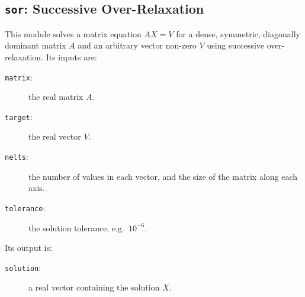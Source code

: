 \subsection{{\tt{sor}}:
	Successive Over-Relaxation
	\label{s:toys-sor}}

This module solves a matrix equation $AX=V$ for
a dense, symmetric, diagonally dominant matrix $A$
and an arbitrary vector non-zero $V$
using successive over-relaxation.
Its inputs are:
\begin{description}
\item[{\tt{matrix}}:]
	the real matrix $A$.
\item[{\tt{target}}:]
	the real vector $V$.
\item[{\tt{nelts}}:]
	the number of values in each vector, and the size of the matrix along each axis.
\item[{\tt{tolerance}}:]
	the solution tolerance, e.g.\ $10^{-6}$.
\end{description}
Its output is:
\begin{description}
\item[{\tt{solution}}:]
	a real vector containing the solution $X$.
\end{description}
